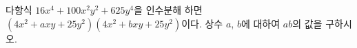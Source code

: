 다항식 $16x^4+100x^2y^2+625y^4$을 인수분해 하면 $(4x^2+axy+25y^2)(4x^2+bxy+25y^2)$이다. 상수 $a$, $b$에 대하여 $ab$의 값을 구하시오.
